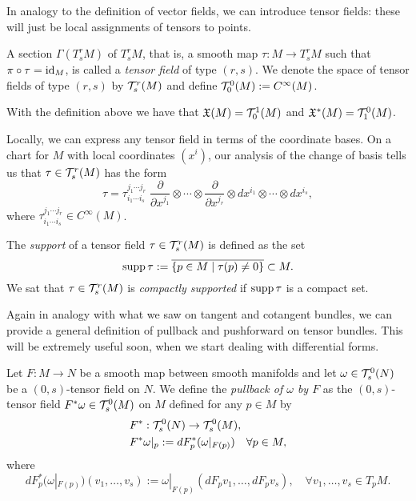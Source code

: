 In analogy to the definition of vector fields, we can introduce tensor fields: these will just be local assignments of tensors to points.

\begin{definition}
	A section $\Gamma(T_s^r M)$ of $T_s^r M$, that is, a smooth map $\tau : M \to T_s^r M$ such that $\pi\circ \tau = \operatorname{id}_M$, is called a \emph{tensor field} of type $(r,s)$.
	We denote the space of tensor fields of type $(r,s)$ by $\mathcal{T}_s^r(M)$ and define $\mathcal{T}_0^0(M) := C^\infty(M)$.
\end{definition}

\begin{example}
	With the definition above we have that $\mathfrak{X}(M) = \mathcal{T}_0^1(M)$ and $\mathfrak{X}^*(M) = \mathcal{T}_1^0(M)$.
\end{example}

Locally, we can express any tensor field in terms of the coordinate bases.
On a chart for $M$ with local coordinates $(x^i)$, our analysis of the change of basis tells us that $\tau\in\mathcal{T}_s^r(M)$ has the form
\begin{equation}
	\tau = \tau^{j_1\cdots j_r}_{i_1\cdots i_s}\; \frac{\partial}{\partial x^{j_1}}\otimes\cdots\otimes\frac{\partial}{\partial x^{j_r}}\otimes dx^{i_1}\otimes\cdots\otimes dx^{i_s},
\end{equation}
where $\tau^{j_1\cdots j_r}_{i_1\cdots i_s}\in C^\infty(M)$.

\begin{definition}
	The \emph{support} of a tensor field $\tau\in\mathcal{T}_s^r(M)$ is defined as the set
	\begin{equation}
		\operatorname{supp} \tau := \overline{\{p\in M\mid \tau(p) \neq 0\}} \subset M.
	\end{equation}
	We sat that $\tau\in\mathcal{T}_s^r(M)$ is \emph{compactly supported} if $\operatorname{supp}\tau$ is a compact set.
\end{definition}

Again in analogy with what we saw on tangent and cotangent bundles, we can provide a general definition of pullback and pushforward on tensor bundles.
This will be extremely useful soon, when we start dealing with differential forms.

\begin{definition}\label{def:pullback0s}
	Let $F:M\to N$ be a smooth map between smooth manifolds and let $\omega \in \mathcal{T}_s^0(N)$ be a $(0,s)$-tensor field on $N$. We define the \emph{pullback of $\omega$ by $F$} as the $(0,s)$-tensor field $F^*\omega \in \mathcal{T}_s^0(M)$ on $M$ defined for any $p\in M$ by
	\begin{align}
		 & F^* : \mathcal{T}_s^0(N) \to \mathcal{T}_s^0(M),                             \\
		 & F^*\omega|_p := dF^*_p(\omega|_{F(p)}) \quad \forall p\in M,
	\end{align}
	where
	\begin{equation}
		dF^*_p(\omega|_{F(p)})(v_1, \ldots, v_s) := \omega|_{F(p)} (dF_p v_1, \ldots, dF_p v_s), \quad\forall v_1, \ldots, v_s \in T_p M.
	\end{equation}
\end{definition}

